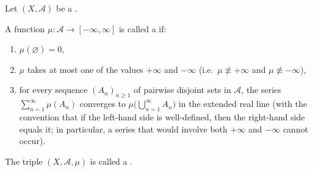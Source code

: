 \begin{definition} \label{definition:signed_measure}
Let $(X, \mathcal{A})$ be a .

A function $\mu : \mathcal{A} \to [-\infty, \infty]$ is called a  if:
\begin{enumerate}
    \item $\mu(\varnothing) = 0$,
    \item $\mu$ takes at most one of the values $+\infty$ and $-\infty$ (i.e.\ $\mu \not\equiv +\infty$ and $\mu \not\equiv -\infty$),
    \item for every sequence $(A_n)_{n\ge 1}$ of pairwise disjoint sets in $\mathcal{A}$, the series $\sum_{n=1}^\infty \mu(A_n)$ converges to $\mu\bigl(\bigcup_{n=1}^\infty A_n\bigr)$ in the extended real line (with the convention that if the left-hand side is well-defined, then the right-hand side equals it; in particular, a series that would involve both $+\infty$ and $-\infty$ cannot occur).
\end{enumerate}
The triple $(X, \mathcal{A}, \mu)$ is called a .
\end{definition}
